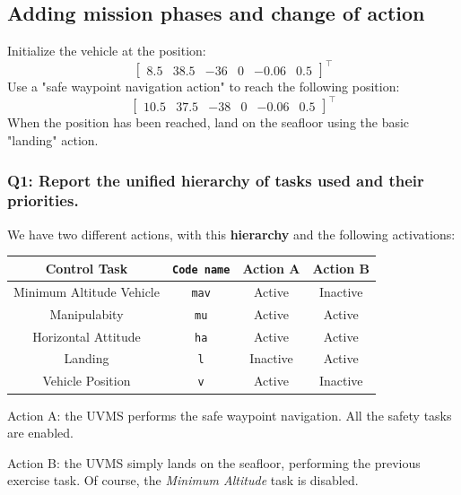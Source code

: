 \documentclass{article}
\begin{document}
\subsection{Adding mission phases and change of action}
Initialize the vehicle at the position:
\begin{displaymath}
\begin{bmatrix} 8.5 & 38.5 & -36 & 0 & -0.06 & 0.5 \end{bmatrix}^\top
\end{displaymath} 
Use a "safe waypoint navigation action" to reach the following position: 
\begin{displaymath}
\begin{bmatrix} 10.5 & 37.5 & -38 & 0 & -0.06 & 0.5 \end{bmatrix}^\top
\end{displaymath} 
When the position has been reached, land on the seafloor using the basic "landing" action.

\subsubsection{Q1: Report the unified hierarchy of tasks used and their priorities.}

We have two different actions, with this \textbf{hierarchy} and the following activations: 
\begin{center}
\begin{tabular}{ | c | c | c | c |}
\hline
 Control Task & \texttt{Code name} & Action A & Action B \\
\hline
 Minimum Altitude Vehicle &  \texttt{mav} & Active & Inactive  \\  
 Manipulabity &  \texttt{mu} & Active & Active  \\
 Horizontal Attitude &  \texttt{ha} & Active & Active \\
 Landing & \texttt{l} &Inactive & Active \\
 Vehicle Position &  \texttt{v} &Active & Inactive \\
 \hline
\end{tabular}
\end{center}

\begin{description}
\item Action A: the UVMS performs the safe waypoint navigation. All the safety tasks are enabled. 
\item Action B: the UVMS simply lands on the seafloor, performing the previous exercise task. Of course, the \textit{Minimum Altitude} task is disabled.
\end{description}
 
\end{document}
